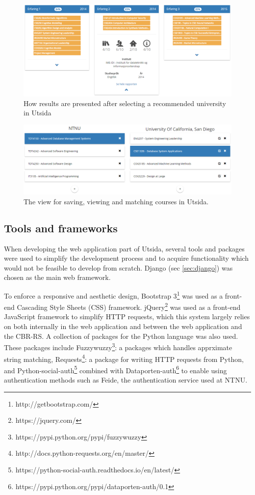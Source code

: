 \begin{figure}[h]
    \centering
    \includegraphics[width=1\textwidth]{fig/utsida_screenshots/results_2_cut.png}
    \caption{How results are presented after selecting a recommended university in Utsida}
    \label{fig:web_results_2}
\end{figure}

\begin{figure}[H]
    \centering
    \includegraphics[width=1\textwidth]{fig/utsida_screenshots/course_match_cut.png}
    \caption{The view for saving, viewing and matching courses in Utsida.}
    \label{fig:web_courses}
\end{figure}

\subsection{Tools and frameworks}
When developing the web application part of Utsida, several tools and packages were used to simplify the development process and to acquire functionality which would not be feasible to develop from scratch. Django (sec \ref{sec:django}) was chosen as the main web framework.

To enforce a responsive and aesthetic design, Bootstrap 3\footnote{http://getbootstrap.com/} was used as a front-end Cascading Style Sheets (CSS) framework. jQuery\footnote{https://jquery.com/} was used as a front-end JavaScript framework to simplify HTTP requests, which this system largely relies on both internally in the web application and between the web application and the CBR-RS. A collection of packages for the Python language was also used. These packages include Fuzzywuzzy\footnote{https://pypi.python.org/pypi/fuzzywuzzy}: a packages which handles apprximate string matching, Requests\footnote{http://docs.python-requests.org/en/master/}: a package for writing HTTP requests from Python, and Python-social-auth\footnote{https://python-social-auth.readthedocs.io/en/latest/} combined with Dataporten-auth\footnote{https://pypi.python.org/pypi/dataporten-auth/0.1} to enable using authentication methods such as Feide, the authentication service used at NTNU.


